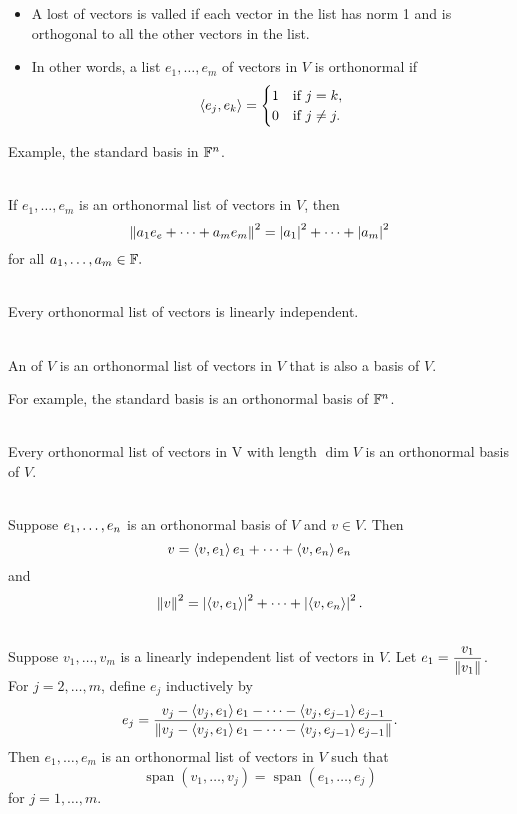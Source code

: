 \begin{itemize}
    \item A lost of vectors is valled  if each vector in the list has norm 1 and is orthogonal to all the other vectors in the list.
    \item In other words, a list $e_1, \dots, e_m$ of vectors in $V$ is orthonormal if
    $$\left\langle{e_j, e_k}\right\rangle = \begin{cases} 1 & \text{if } j = k,\\0 & \text{if } j \neq j. \end{cases}$$
\end{itemize}

\nl Example, the standard basis in $\mathbb{F}^n$. 

\\
If $e_1, \dots, e_m$ is an orthonormal list of vectors in $V$, then 
$$\left\| {a_1e_e + \cdots + a_m e_m} \right\|^2 = \left| {a_1} \right|^2 + \cdots + \left| {a_m} \right|^2$$
for all $a_1,\dots, a_m \in \mathbb{F}.$

\\
Every orthonormal list of vectors is linearly independent.

\\
An  of $V$ is an orthonormal list of vectors in $V$ that is also a basis of $V$.

\nl For example, the standard basis is an orthonormal basis of $\mathbb{F}^n$.

\\Every orthonormal list of vectors in V with length $\dim V$ is an orthonormal basis of $V$.

\\
Suppose ${e}_1, \dots, {e}_n$ is an orthonormal basis of $V$ and $v \in V$. Then
$$v = \left\langle{v,e_1}\right\rangle e_1 + \cdots + \left\langle{v,e_n}\right\rangle e_n$$
and
$$\left\| {v} \right\|^2 = \left| {\left\langle{v,e_1}\right\rangle} \right|^2 + \cdots + \left| {\left\langle{v,e_n}\right\rangle} \right|^2.$$

\\
Suppose $v_1, \dots, v_m$ is a linearly independent list of vectors in $V$. Let $e_1 = \dfrac{v_1}{\left\| {v_1} \right\|}$. \\For $j = 2, \dots, m$, define $e_j$ inductively by
$$e_j = \frac{v_j - \left\langle{v_j,e_1}\right\rangle e_1 - \cdots - \left\langle{v_j, e_{j-1}}\right\rangle e_{j-1}}{\left\| {v_j - \left\langle{v_j,e_1}\right\rangle e_1 - \cdots - \left\langle{v_j, e_{j-1}}\right\rangle e_{j-1}} \right\|}.$$
Then $e_1, \dots, e_m$ is an orthonormal list of vectors in $V$ such that
$$\operatorname{span}(v_1,\dots,v_j) = \operatorname{span}(e_1,\dots,e_j)$$
for $j = 1,\dots, m$.

